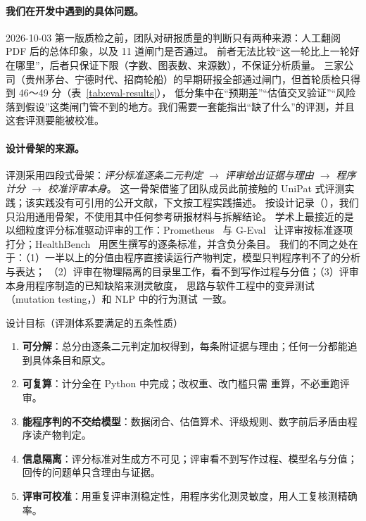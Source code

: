 \paragraph{我们在开发中遇到的具体问题。}
2026-10-03 第一版质检之前，团队对研报质量的判断只有两种来源：人工翻阅 PDF 后的总体印象，以及 11 道闸门是否通过。
前者无法比较“这一轮比上一轮好在哪里”，后者只保证下限（字数、图表数、来源数），不保证分析质量。
三家公司（贵州茅台、宁德时代、招商轮船）的早期研报全部通过闸门，但首轮质检只得到 46～49 分（表~\ref{tab:eval-results}），
低分集中在“预期差”“估值交叉验证”“风险落到假设”这类闸门管不到的地方。我们需要一套能指出“缺了什么”的评测，并且这套评测要能被校准。

\paragraph{设计骨架的来源。}
评测采用四段式骨架：\emph{评分标准逐条二元判定 $\to$ 评审给出证据与理由 $\to$ 程序计分 $\to$ 校准评审本身}。
这一骨架借鉴了团队成员此前接触的 UniPat 式评测实践；该实践没有可引用的公开文献，下文按工程实践描述。
按设计记录（），我们只沿用通用骨架，不使用其中任何参考研报材料与拆解结论。
学术上最接近的是以细粒度评分标准驱动评审的工作：Prometheus~\citep{kim2024prometheus} 与 G-Eval~\citep{liu2023geval}
让评审按标准逐项打分；HealthBench~\citep{arora2025healthbench} 用医生撰写的逐条标准，并含负分条目。
我们的不同之处在于：（1）一半以上的分值由程序直接读运行产物判定，模型只判程序判不了的分析与表达；
（2）评审在物理隔离的目录里工作，看不到写作过程与分值；（3）评审本身用程序制造的已知缺陷来测灵敏度，
思路与软件工程中的变异测试（mutation testing，\citealp{demillo1978hints,jia2011mutation}）和 NLP 中的行为测试~\citep{ribeiro2020checklist}一致。

\begin{designbox}{设计目标（评测体系要满足的五条性质）}
\begin{enumerate}[leftmargin=1.4em]
  \item \textbf{可分解}：总分由逐条二元判定加权得到，每条附证据与理由；任何一分都能追到具体条目和原文。
  \item \textbf{可复算}：计分全在 Python 中完成；改权重、改门槛只需  重算，不必重跑评审。
  \item \textbf{能程序判的不交给模型}：数据闭合、估值算术、评级规则、数字前后矛盾由程序读产物判定。
  \item \textbf{信息隔离}：评分标准对生成方不可见；评审看不到写作过程、模型名与分值；回传的问题单只含理由与证据。
  \item \textbf{评审可校准}：用重复评审测稳定性，用程序劣化测灵敏度，用人工复核测精确率。
\end{enumerate}
\end{designbox}

